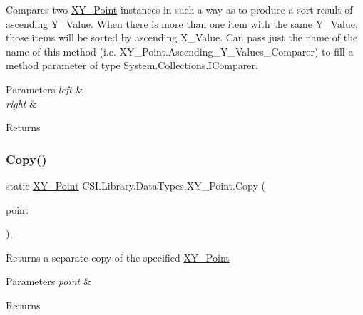 Compares two \mbox{\hyperlink{struct_c_s_i_1_1_library_1_1_data_types_1_1_x_y___point}{X\+Y\+\_\+\+Point}} instances in such a way as to produce a sort result of ascending Y\+\_\+\+Value. When there is more than one item with the same Y\+\_\+\+Value, those items will be sorted by ascending X\+\_\+\+Value. Can pass just the name of the name of this method (i.\+e. X\+Y\+\_\+\+Point.\+Ascending\+\_\+\+Y\+\_\+\+Values\+\_\+\+Comparer) to fill a method parameter of type System.\+Collections.\+I\+Comparer. 


\begin{DoxyParams}{Parameters}
{\em left} & \\
\hline
{\em right} & \\
\hline
\end{DoxyParams}
\begin{DoxyReturn}{Returns}

\end{DoxyReturn}
\mbox{\label{struct_c_s_i_1_1_library_1_1_data_types_1_1_x_y___point_a6d68dc560610ff388fbde1de0c747e0b}} 
\subsubsection{\texorpdfstring{Copy()}{Copy()}}
{\footnotesize\ttfamily static \mbox{\hyperlink{struct_c_s_i_1_1_library_1_1_data_types_1_1_x_y___point}{X\+Y\+\_\+\+Point}} C\+S\+I.\+Library.\+Data\+Types.\+X\+Y\+\_\+\+Point.\+Copy (\begin{DoxyParamCaption}\item[{\mbox{\hyperlink{struct_c_s_i_1_1_library_1_1_data_types_1_1_x_y___point}{X\+Y\+\_\+\+Point}}}]{point }\end{DoxyParamCaption})\hspace{0.3cm}{\ttfamily [inline]}, {\ttfamily [static]}}



Returns a separate copy of the specified \mbox{\hyperlink{struct_c_s_i_1_1_library_1_1_data_types_1_1_x_y___point}{X\+Y\+\_\+\+Point}} 


\begin{DoxyParams}{Parameters}
{\em point} & \\
\hline
\end{DoxyParams}
\begin{DoxyReturn}{Returns}

\end{DoxyReturn}
\mbox{\label{struct_c_s_i_1_1_library_1_1_data_types_1_1_x_y___point_ac51d0348e69f3cbe10d2fec50ab3d271}} 
